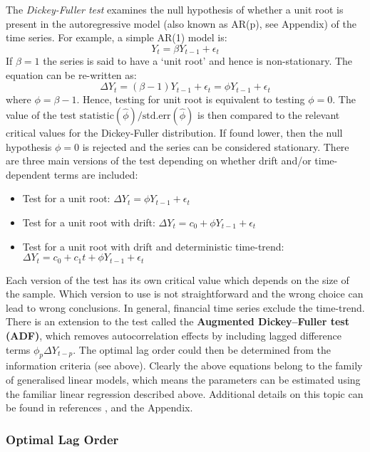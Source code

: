 \documentclass[11pt]{article}
\providecommand{\tightlist}{%
      \setlength{\itemsep}{0pt}\setlength{\parskip}{0pt}}
\begin{document}
\begin{appendices}
The \emph{Dickey-Fuller test} examines the null hypothesis of whether a
unit root is present in the autoregressive model (also known as AR(p),
see Appendix) of the time series. For example, a simple AR(1) model is:
\begin{equation}
Y_t = \beta Y_{t-1} + \epsilon_t
\end{equation}
If \(\beta=1\) the series is said to have a `unit root' and hence is
non-stationary. The equation can be re-written as:
\begin{equation}
\Delta Y_t = (\beta - 1) Y_{t-1} + \epsilon_t = \phi Y_{t-1} + \epsilon_t
\end{equation}
where \(\phi= \beta-1\). Hence, testing for unit root is equivalent to
testing \(\phi=0\).
The value of the test $\text{statistic}(\hat{\phi})/\text{std.err}(\hat{\phi})$ is
then compared to the relevant critical values for the Dickey-Fuller
distribution. If found lower, then the null hypothesis \(\phi=0\) is
rejected and the series can be considered stationary.
There are three main versions of the test depending on whether drift and/or
time-dependent terms are included:
\begin{itemize}
\tightlist
\item
  Test for a unit root: \(\Delta Y_t = \phi Y_{t-1} + \epsilon_t\)
\item
  Test for a unit root with drift:
  \(\Delta Y_t = c_0 + \phi Y_{t-1} + \epsilon_t\)
\item
  Test for a unit root with drift and deterministic time-trend:
  \(\Delta Y_t = c_0 + c_1 t + \phi Y_{t-1} + \epsilon_t\)
\end{itemize}
Each version of the test has its own critical value which depends on
the size of the sample. Which version to use is not straightforward and
the wrong choice can lead to wrong conclusions. In general, financial
time series exclude the time-trend.
There is an extension to the test called the \textbf{Augmented
Dickey--Fuller test (ADF)}, which removes autocorrelation effects by
including lagged difference terms \(\phi_p \Delta Y_{t-p}\). The optimal
lag order could then be determined from the information criteria (see
above).
Clearly the above equations belong to the family of generalised linear
models, which means the parameters can be estimated using the familiar
linear regression described above.
Additional details on this topic can be found in references \cite{wikiADF}, \cite{wikiDF} and the Appendix.

    \subsubsection{Optimal Lag Order}\label{optimal-lag-order}
    

\end{appendices}
\end{document}
